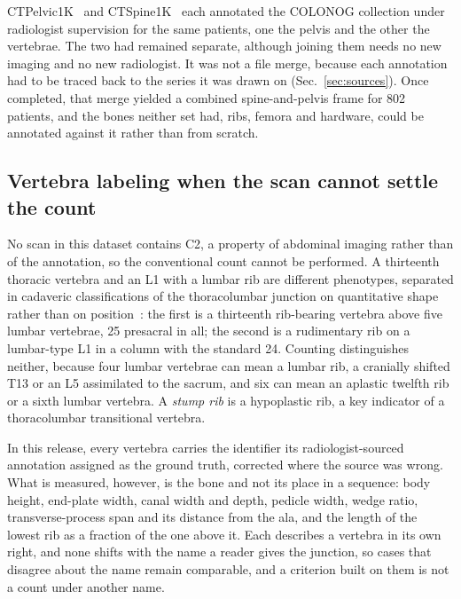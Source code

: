 \documentclass[aapm,mph,amsmath,amssymb,preprint,linenumbers]{revtex4-2}
\begin{document}
CTPelvic1K~\cite{ctpelvic1k} and CTSpine1K~\cite{ctspine1k} each annotated the COLONOG
collection under radiologist supervision for the same patients, one the pelvis and the other the vertebrae. The two had remained separate, although joining them needs no new imaging and no new radiologist. It was not a file merge, because each annotation had to be traced back to the series it was
drawn on (Sec.~\ref{sec:sources}). Once completed, that merge yielded a combined spine-and-pelvis frame
for 802 patients, and the bones neither set had, ribs, femora and hardware, could be
annotated against it rather than from scratch.



\subsection{Vertebra labeling when the scan cannot settle the count}

No scan in this dataset contains C2, a property of abdominal imaging rather than of the
annotation, so the conventional count cannot be performed. A thirteenth thoracic vertebra and
an L1 with a lumbar rib are different phenotypes, separated in cadaveric classifications of
the thoracolumbar junction on quantitative shape rather than on
position~\cite{duplessis2018,poolman2023}: the first is a thirteenth rib-bearing vertebra
above five lumbar vertebrae, 25 presacral in all; the second is a rudimentary rib on a
lumbar-type L1 in a column with the standard 24. Counting distinguishes neither, because four
lumbar vertebrae can mean a lumbar rib, a cranially shifted T13 or an L5 assimilated to the
sacrum, and six can mean an aplastic twelfth rib or a sixth lumbar vertebra. A \emph{stump
rib} is a hypoplastic rib, a key indicator of a thoracolumbar transitional vertebra.

In this release, every vertebra carries the identifier its radiologist-sourced annotation
assigned as the ground truth, corrected where the source was wrong. What is measured, however,
is the bone and not its place in a sequence: body height, end-plate width, canal width and
depth, pedicle width, wedge ratio, transverse-process span and its distance from the ala, and
the length of the lowest rib as a fraction of the one above it. Each describes a vertebra in
its own right, and none shifts with the name a reader gives the junction, so cases that
disagree about the name remain comparable, and a criterion built on them is not a count under
another name.
\end{document}
